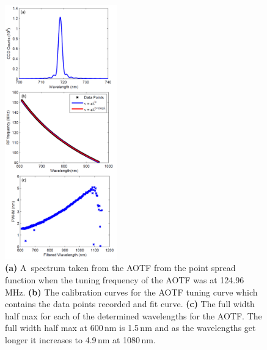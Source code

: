 \documentclass[amtd, online, hvmath]{copernicus}
\begin{document}
\begin{figure}
\includegraphics[height=110mm]{amt-2015-329-discussions-f06.pdf}
\caption{\textbf{(a)} A~spectrum taken from the AOTF from the point
  spread function when the tuning frequency of the AOTF was at
  124.96\,\unit{MHz}. \textbf{(b)} The calibration curves for the AOTF
  tuning curve which contains the data points recorded and fit
  curve. \textbf{(c)} The full width half max for each of the
  determined wavelengths for the AOTF. The full width half max at
  600\,\unit{nm} is 1.5\,\unit{nm} and as the wavelengths get longer
  it increases to 4.9\,\unit{nm} at 1080\,\unit{nm}.}
\label{amtd-2015-0329-f06.pdf}
\end{figure}
\end{document}
